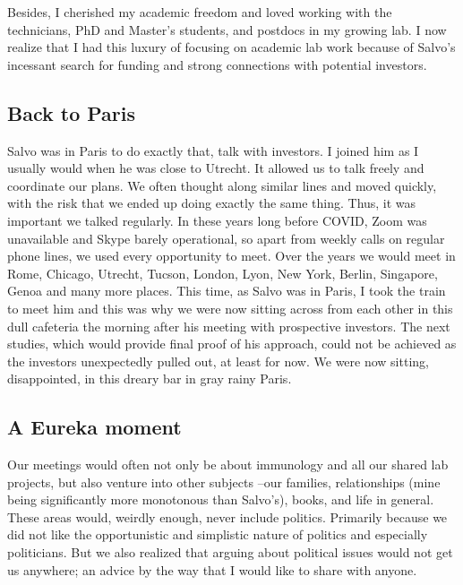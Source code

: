\documentclass[authordate, editorial]{jote-new-article}
\begin{document}
	Besides, I cherished my academic freedom and loved working with the technicians, PhD and Master's students, and postdocs in my growing lab. I now realize that I had this luxury of focusing on academic lab work because of Salvo's incessant search for funding and strong connections with potential investors.







	\subsection{Back to Paris}



	Salvo was in Paris to do exactly that, talk with investors. I joined him as I usually would when he was close to Utrecht. It allowed us to talk freely and coordinate our plans. We often thought along similar lines and moved quickly, with the risk that we ended up doing exactly the same thing. Thus, it was important we talked regularly. In these years long before COVID, Zoom was unavailable and Skype barely operational, so apart from weekly calls on regular phone lines, we used every opportunity to meet. Over the years we would meet in Rome, Chicago, Utrecht, Tucson, London, Lyon, New York, Berlin, Singapore, Genoa and many more places. This time, as Salvo was in Paris, I took the train to meet him and this was why we were now sitting across from each other in this dull cafeteria the morning after his meeting with prospective investors. The next studies, which would provide final proof of his approach, could not be achieved as the investors unexpectedly pulled out, at least for now. We were now sitting, disappointed, in this dreary bar in gray rainy Paris.



	\subsection{A Eureka moment}



	Our meetings would often not only be about immunology and all our shared lab projects, but also venture into other subjects --our families, relationships (mine being significantly more monotonous than Salvo's), books, and life in general. These areas would, weirdly enough, never include politics. Primarily because we did not like the opportunistic and simplistic nature of politics and especially politicians. But we also realized that arguing about political issues would not get us anywhere; an advice by the way that I would like to share with anyone.
\end{document}
